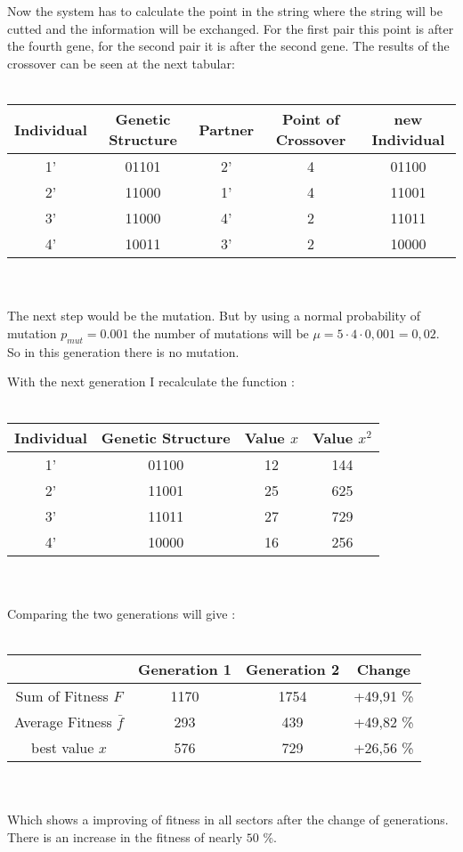 \\
\\
Now the system has to calculate the point in the string where the string will
be cutted and the information will be exchanged.
For the first pair this point is after the fourth gene, for the second pair it
is after the second gene. The results of the crossover can be seen at the next
tabular:\\
\\
\begin{tabular}{c|c|c|c|c}
Individual & Genetic Structure & Partner & Point of Crossover & new Individual\\ \hline
 1' & 01101 & 2' & 4 & 01100\\
 2' & 11000 & 1' & 4 & 11001\\
 3' & 11000 & 4' & 2 & 11011\\
 4' & 10011 & 3' & 2 & 10000\\
\end{tabular}
\\
\\
The next step would be the mutation. But by using a normal probability of mutation
$p_{mut} = 0.001$ the number of mutations will be $\mu = 5 \cdot 4 \cdot 0,001 = 0,02$.
So in this generation there is no mutation.

With the next generation I recalculate the function :\\
\\
\begin{tabular}{c|c|c|c}
Individual & Genetic Structure & Value $x$ & Value $x^2$\\ \hline
 1' & 01100 & 12 & 144\\
 2' & 11001 & 25 & 625\\
 3' & 11011 & 27 & 729\\
 4' & 10000 & 16 & 256\\
\end{tabular}
\\
\\
Comparing the two generations will give :\\
\\
\begin{tabular}{c|c|c|c}
 & Generation 1 & Generation 2 & Change\\ \hline
 Sum of Fitness $F$ & 1170 & 1754 & +49,91 \% \\
 Average Fitness $\bar{f}$ & 293 & 439 & +49,82 \% \\
 best value  $x$ & 576 & 729 & +26,56 \%\\
\end{tabular}
\\
\\
Which shows a improving of fitness in all sectors after the change of generations.
There is an increase in the fitness of nearly $50$ \%.
